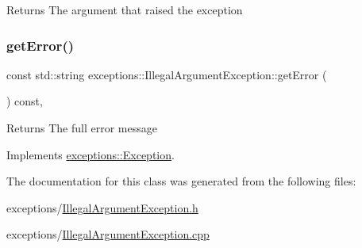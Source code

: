 \begin{DoxyReturn}{Returns}
The argument that raised the exception 
\end{DoxyReturn}
\mbox{\label{classexceptions_1_1IllegalArgumentException_aa11433daf8612e2730a0473f402d297a}} 
\subsubsection{\texorpdfstring{get\+Error()}{getError()}}
{\footnotesize\ttfamily const std\+::string exceptions\+::\+Illegal\+Argument\+Exception\+::get\+Error (\begin{DoxyParamCaption}{ }\end{DoxyParamCaption}) const\hspace{0.3cm}{\ttfamily [override]}, {\ttfamily [virtual]}}

\begin{DoxyReturn}{Returns}
The full error message 
\end{DoxyReturn}


Implements \hyperlink{classexceptions_1_1Exception}{exceptions\+::\+Exception}.



The documentation for this class was generated from the following files\+:\begin{DoxyCompactItemize}
\item 
exceptions/\hyperlink{IllegalArgumentException_8h}{Illegal\+Argument\+Exception.\+h}\item 
exceptions/\hyperlink{IllegalArgumentException_8cpp}{Illegal\+Argument\+Exception.\+cpp}\end{DoxyCompactItemize}
